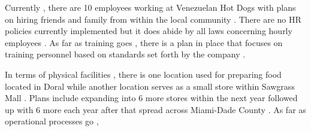   Currently , there are 10 employees working at Venezuelan Hot Dogs with plans on hiring friends and family from within the local community . There are no HR policies currently implemented but it does abide by all laws concerning hourly employees . As far as training goes , there is a plan in place that focuses on training personnel based on standards set forth by the company . 

  In terms of physical facilities , there is one location used for preparing food located in Doral while another location serves as a small store within Sawgrass Mall . Plans include expanding into 6 more stores within the next year followed up with 6 more each year after that spread across Miami-Dade County . As far as operational processes go ,